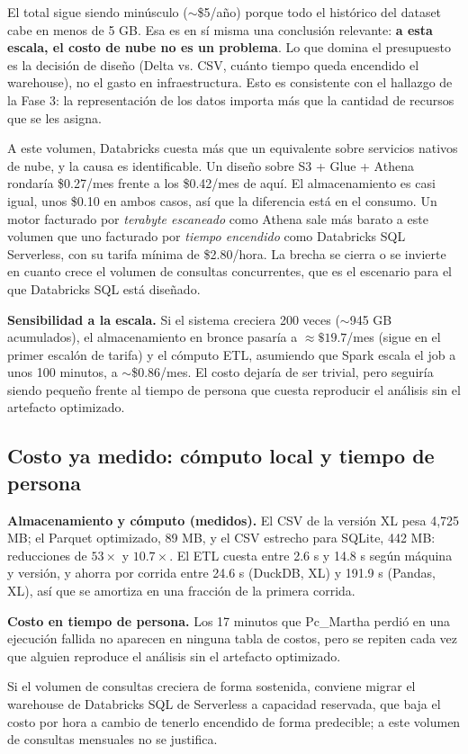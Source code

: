 El total sigue siendo minúsculo ($\sim$\$5/año) porque todo el histórico del dataset cabe en menos de 5 GB. Esa es en sí misma una conclusión relevante: \textbf{a esta escala, el costo de nube no es un problema}. Lo que domina el presupuesto es la decisión de diseño (Delta vs. CSV, cuánto tiempo queda encendido el warehouse), no el gasto en infraestructura. Esto es consistente con el hallazgo de la Fase 3: la representación de los datos importa más que la cantidad de recursos que se les asigna.

A este volumen, Databricks cuesta más que un equivalente sobre servicios nativos de nube, y la causa es identificable. Un diseño sobre S3 + Glue + Athena rondaría \$0.27/mes frente a los \$0.42/mes de aquí. El almacenamiento es casi igual, unos \$0.10 en ambos casos, así que la diferencia está en el consumo. Un motor facturado por \emph{terabyte escaneado} como Athena sale más barato a este volumen que uno facturado por \emph{tiempo encendido} como Databricks SQL Serverless, con su tarifa mínima de \$2.80/hora. La brecha se cierra o se invierte en cuanto crece el volumen de consultas concurrentes, que es el escenario para el que Databricks SQL está diseñado.

\textbf{Sensibilidad a la escala.} Si el sistema creciera 200 veces ($\sim$945 GB acumulados), el almacenamiento en bronce pasaría a $\approx\$19.7$/mes (sigue en el primer escalón de tarifa) y el cómputo ETL, asumiendo que Spark escala el job a unos 100 minutos, a $\sim$\$0.86/mes. El costo dejaría de ser trivial, pero seguiría siendo pequeño frente al tiempo de persona que cuesta reproducir el análisis sin el artefacto optimizado.

\subsection{Costo ya medido: cómputo local y tiempo de persona}

\textbf{Almacenamiento y cómputo (medidos).} El CSV de la versión XL pesa 4,725 MB; el Parquet optimizado, 89 MB, y el CSV estrecho para SQLite, 442 MB: reducciones de $53\times$ y $10.7\times$. El ETL cuesta entre 2.6 s y 14.8 s según máquina y versión, y ahorra por corrida entre 24.6 s (DuckDB, XL) y 191.9 s (Pandas, XL), así que se amortiza en una fracción de la primera corrida.

\textbf{Costo en tiempo de persona.} Los 17 minutos que Pc\_Martha perdió en una ejecución fallida no aparecen en ninguna tabla de costos, pero se repiten cada vez que alguien reproduce el análisis sin el artefacto optimizado.

Si el volumen de consultas creciera de forma sostenida, conviene migrar el warehouse de Databricks SQL de Serverless a capacidad reservada, que baja el costo por hora a cambio de tenerlo encendido de forma predecible; a este volumen de consultas mensuales no se justifica.
